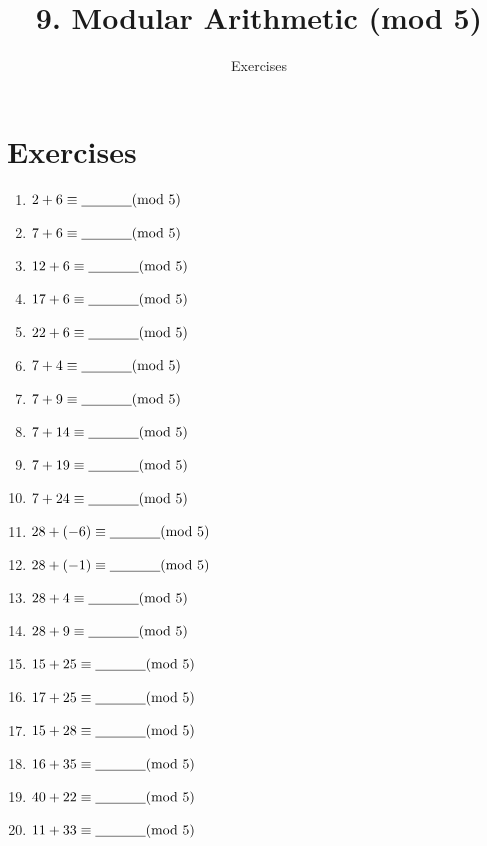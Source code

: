 \documentclass[11pt]{article}
\title{9. Modular Arithmetic (mod 5)}
\author{Exercises}
\newcommand{\mblank}{\hbox{\underline{\hspace{0.5in}}}}
\begin{document}
\maketitle
\section{Exercises}
\begin{enumerate}
	\item $2+6 \equiv \mblank (\hbox{mod } 5)$
	\item $7+6 \equiv \mblank (\hbox{mod } 5)$
	\item $12+6 \equiv \mblank (\hbox{mod } 5)$
	\item $17+6 \equiv \mblank (\hbox{mod } 5)$
	\item $22+6 \equiv \mblank (\hbox{mod } 5)$
	\item $7 + 4 \equiv \mblank (\hbox{mod } 5)$
	\item $7 + 9 \equiv \mblank (\hbox{mod } 5)$
	\item $7 + 14 \equiv \mblank (\hbox{mod } 5)$
	\item $7 + 19 \equiv \mblank (\hbox{mod } 5)$
	\item $7 + 24 \equiv \mblank (\hbox{mod } 5)$
	\item $28+ (-6) \equiv \mblank (\hbox{mod } 5)$
	\item $28+ (-1) \equiv \mblank (\hbox{mod } 5)$
	\item $28+ 4 \equiv \mblank (\hbox{mod } 5)$
	\item $28+ 9 \equiv \mblank (\hbox{mod } 5)$
	\item $15 + 25 \equiv \mblank (\hbox{mod } 5)$
	\item $17 + 25 \equiv \mblank (\hbox{mod } 5)$
	\item $15 + 28 \equiv \mblank (\hbox{mod } 5)$
	\item $16 + 35 \equiv \mblank (\hbox{mod } 5)$
	\item $40 + 22 \equiv \mblank (\hbox{mod } 5)$
	\item $11 + 33 \equiv \mblank (\hbox{mod } 5)$
\end{enumerate}
\newpage
\end{document}
